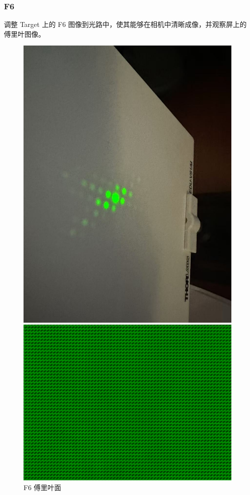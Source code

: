 \documentclass{ctexart}
\begin{document}
\subsubsection{F6}
调整 Target 上的 F6 图像到光路中，使其能够在相机中清晰成像，并观察屏上的傅里叶图像。
\begin{figure}[H]
  \centering
  \begin{minipage}[b]{0.2\textwidth}
    \centering
    \includegraphics[width=\textwidth]{pictures/微信图片_20241017164805.jpg}
    \caption{F6 傅里叶面}
  \end{minipage}
  \hspace{0.1\textwidth} %
  \begin{minipage}[b]{0.3\textwidth}
    \centering
    \includegraphics[width=\textwidth]{pictures/F6-nomask.png}

\end{minipage}
\end{figure}
\end{document}
